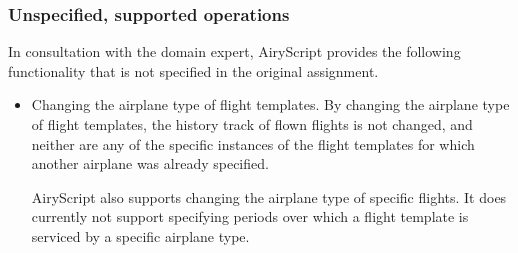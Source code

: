 \subsubsection{Unspecified, supported operations}
In consultation with the domain expert, AiryScript provides the following
functionality that is not specified in the original assignment.
\begin{itemize}
  \item Changing the airplane type of flight templates. By changing the airplane
    type of flight templates, the history track of flown flights is not changed,
    and neither are any of the specific instances of the flight templates for
    which another airplane was already specified.

    AiryScript also supports changing the airplane type of specific flights. It
    does currently not support specifying periods over which a flight template
    is serviced by a specific airplane type.
\end{itemize}


